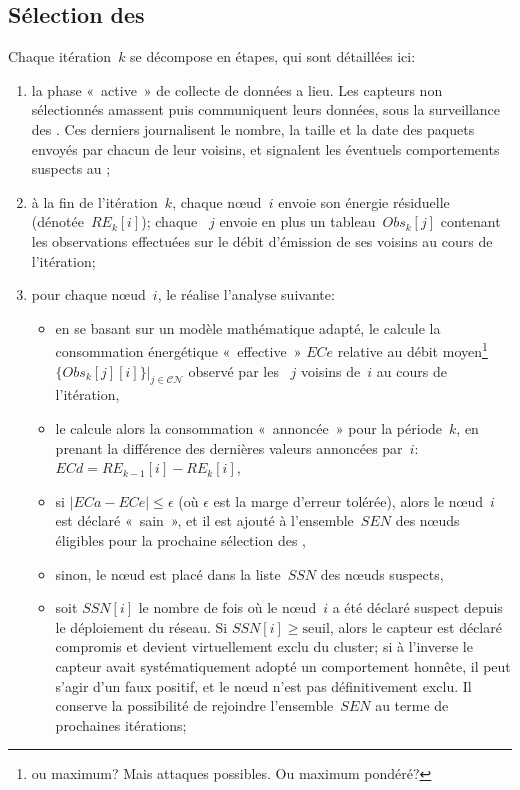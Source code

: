 \subsection{Sélection des \cns}

Chaque itération~$k$ se décompose en étapes, qui sont détaillées ici:
\begin{enumerate}
    \item la phase « active » de collecte de données a lieu. Les capteurs non sélectionnés amassent puis communiquent leurs données, sous la surveillance des \cns. Ces derniers journalisent le nombre, la taille et la date des paquets envoyés par chacun de leur voisins, et signalent les éventuels comportements suspects au \ch;
    \item à la fin de l'itération~$k$, chaque nœud~$i$ envoie son énergie résiduelle (dénotée~$RE_k[i]$); chaque \cn~$j$ envoie en plus un tableau~$Obs_k[j]$ contenant les observations effectuées sur le débit d'émission de ses voisins au cours de l'itération;
    \item pour chaque nœud~$i$, le \ch réalise l'analyse suivante:
        \begin{itemize}
            \item en se basant sur un modèle mathématique adapté, le \CH calcule la consommation énergétique « effective » $ECe$ relative au débit moyen\footnote{ou maximum? Mais attaques possibles. Ou maximum pondéré?} $\{Obs_k[j][i]\}|_{j\in \mathcal{CN}}$ observé par les \cns~$j$ voisins de~$i$ au cours de l'itération,
            \item le \CH calcule alors la consommation « annoncée » pour la période~$k$, en prenant la différence des dernières valeurs annoncées par~$i$: $ECd=RE_{k-1}[i] - RE_k[i]$,
            \item si $|ECa-ECe|\leq\epsilon$ (où $\epsilon$ est la marge d'erreur tolérée), alors le nœud~$i$ est déclaré « sain », et il est ajouté à l'ensemble~$SEN$ des nœuds éligibles pour la prochaine sélection des \cns,
            \item sinon, le nœud est placé dans la liste~$SSN$ des nœuds suspects,
            \item soit $SSN[i]$ le nombre de fois où le nœud~$i$ a été déclaré suspect depuis le déploiement du réseau. Si $SSN[i] \ge \mathrm{seuil}$, alors le capteur est déclaré compromis et devient virtuellement exclu du cluster; si à l'inverse le capteur avait systématiquement adopté un comportement honnête, il peut s'agir d'un faux positif, et le nœud n'est pas définitivement exclu. Il conserve la possibilité de rejoindre l'ensemble~$SEN$ au terme de prochaines itérations;

\end{itemize}
\end{enumerate}
